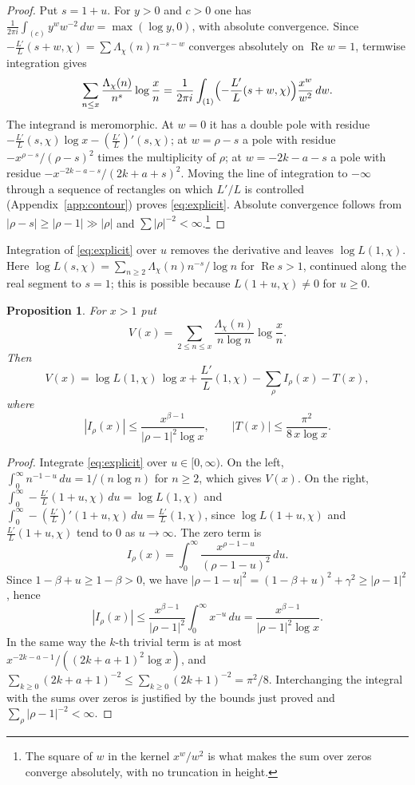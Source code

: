 \documentclass[11pt]{amsart}
\newtheorem{proposition}[theorem]{Proposition}
\theoremstyle{definition}
\theoremstyle{remark}
\newcommand{\Lam}{\Lambda_\chi}
\renewcommand{\Re}{\operatorname{Re}}
\begin{document}
\begin{proof}
Put $s=1+u$. For $y>0$ and $c>0$ one has $\frac1{2\pi i}\int_{(c)}y^w w^{-2}\,dw=\max(\log y,0)$, with absolute convergence. Since $-\frac{L'}{L}(s+w,\chi)=\sum\Lam(n)n^{-s-w}$ converges absolutely on $\Re w=1$, termwise integration gives
\[
\sum_{n\le x}\frac{\Lam(n)}{n^{s}}\log\frac xn=\frac1{2\pi i}\int_{(1)}\Bigl(-\frac{L'}{L}(s+w,\chi)\Bigr)\frac{x^w}{w^2}\,dw .
\]
The integrand is meromorphic. At $w=0$ it has a double pole with residue $-\frac{L'}{L}(s,\chi)\log x-(\frac{L'}{L})'(s,\chi)$; at $w=\rho-s$ a pole with residue $-x^{\rho-s}/(\rho-s)^2$ times the multiplicity of $\rho$; at $w=-2k-a-s$ a pole with residue $-x^{-2k-a-s}/(2k+a+s)^2$. Moving the line of integration to $-\infty$ through a sequence of rectangles on which $L'/L$ is controlled (Appendix~\ref{app:contour}) proves \eqref{eq:explicit}. Absolute convergence follows from $|\rho-s|\ge|\rho-1|\gg|\rho|$ and $\sum|\rho|^{-2}<\infty$.\footnote{The square of $w$ in the kernel $x^w/w^2$ is what makes the sum over zeros converge absolutely, with no truncation in height.}
\end{proof}

Integration of \eqref{eq:explicit} over $u$ removes the derivative and leaves $\log L(1,\chi)$. Here $\log L(s,\chi)=\sum_{n\ge2}\Lam(n)n^{-s}/\log n$ for $\Re s>1$, continued along the real segment to $s=1$; this is possible because $L(1+u,\chi)\neq0$ for $u\ge0$.

\begin{proposition}\label{prop:integrated}
For $x>1$ put
\[
V(x)=\sum_{2\le n\le x}\frac{\Lam(n)}{n\log n}\log\frac xn .
\]
Then
\[
V(x)=\log L(1,\chi)\,\log x+\frac{L'}{L}(1,\chi)-\sum_\rho I_\rho(x)-T(x),
\]
where
\[
|I_\rho(x)|\le\frac{x^{\beta-1}}{|\rho-1|^2\log x},\qquad |T(x)|\le \frac{\pi^2}{8\,x\log x}.
\]
\end{proposition}

\begin{proof}
Integrate \eqref{eq:explicit} over $u\in[0,\infty)$. On the left, $\int_0^\infty n^{-1-u}\,du=1/(n\log n)$ for $n\ge2$, which gives $V(x)$. On the right, $\int_0^\infty-\frac{L'}{L}(1+u,\chi)\,du=\log L(1,\chi)$ and $\int_0^\infty-(\frac{L'}{L})'(1+u,\chi)\,du=\frac{L'}{L}(1,\chi)$, since $\log L(1+u,\chi)$ and $\frac{L'}{L}(1+u,\chi)$ tend to $0$ as $u\to\infty$. The zero term is
\[
I_\rho(x)=\int_0^\infty\frac{x^{\rho-1-u}}{(\rho-1-u)^2}\,du .
\]
Since $1-\beta+u\ge1-\beta>0$, we have $|\rho-1-u|^2=(1-\beta+u)^2+\gamma^2\ge|\rho-1|^2$, hence
\[
|I_\rho(x)|\le\frac{x^{\beta-1}}{|\rho-1|^2}\int_0^\infty x^{-u}\,du=\frac{x^{\beta-1}}{|\rho-1|^2\log x}.
\]
In the same way the $k$-th trivial term is at most $x^{-2k-a-1}/((2k+a+1)^2\log x)$, and
$\sum_{k\ge0}(2k+a+1)^{-2}\le\sum_{k\ge0}(2k+1)^{-2}=\pi^2/8$. Interchanging the integral with the sums over zeros is justified by the bounds just proved and $\sum_\rho|\rho-1|^{-2}<\infty$.
\end{proof}
\end{document}
